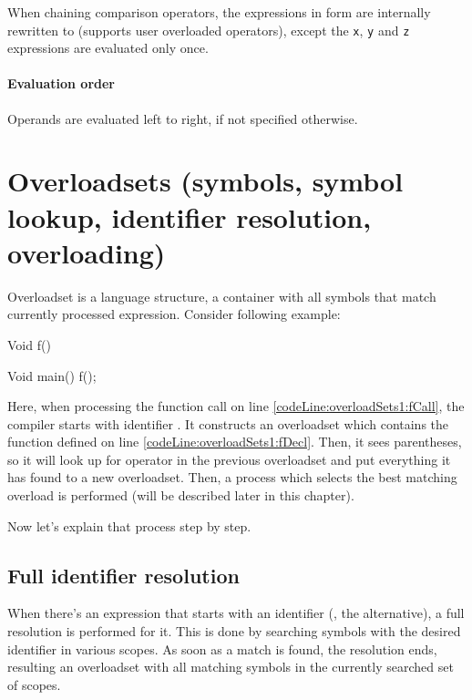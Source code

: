 When chaining comparison operators, the expressions in form  are internally rewritten to  (supports user overloaded operators), except the \verb|x|, \verb|y| and \verb|z| expressions are evaluated only once.

\paragraph{Evaluation order}
Operands are evaluated left to right, if not specified otherwise.

\section{Overloadsets (symbols, symbol lookup, identifier resolution, overloading)}
Overloadset is a language structure, a container with all symbols that match currently processed expression. Consider following example:

\begin{code}
	Void f() {}$\label{codeLine:overloadSets1:fDecl}$
	
	Void main() {
		f();$\label{codeLine:overloadSets1:fCall}$	
	}
\end{code}

Here, when processing the function call on line \ref{codeLine:overloadSets1:fCall}, the compiler starts with identifier . It constructs an overloadset which contains the function  defined on line \ref{codeLine:overloadSets1:fDecl}. Then, it sees parentheses, so it will look up for operator  in the previous overloadset and put everything it has found to a new overloadset. Then, a process which selects the best matching overload is performed (will be described later in this chapter).

Now let's explain that process step by step.

\subsection{Full identifier resolution} \label{fullIdentifierResolution}
When there's an expression that starts with an identifier (, the  alternative), a full resolution is performed for it. This is done by searching symbols with the desired identifier in various scopes. As soon as a match is found, the resolution ends, resulting an overloadset with all matching symbols in the currently searched set of scopes.

